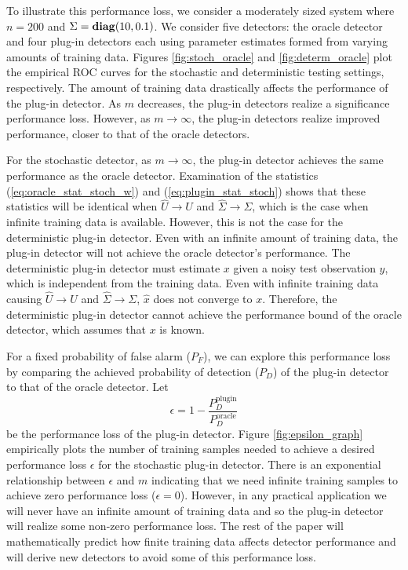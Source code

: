 To illustrate this performance loss, we consider a moderately sized system where $n=200$ and $\Sigma=\mathop{\bf diag}(10,0.1)$. We consider five detectors: the oracle detector and four plug-in detectors each using parameter estimates formed from varying amounts of training data. Figures \ref{fig:stoch_oracle} and \ref{fig:determ_oracle} plot the empirical ROC curves for the stochastic and deterministic testing settings, respectively. The amount of training data drastically affects the performance of the plug-in detector. As $m$ decreases, the plug-in detectors realize a significance performance loss. However, as $m\to\infty$, the plug-in detectors realize improved performance, closer to that of the oracle detectors.

For the stochastic detector, as $m\to\infty$, the plug-in detector achieves the same performance as the oracle detector. Examination of the statistics (\ref{eq:oracle_stat_stoch_w}) and (\ref{eq:plugin_stat_stoch}) shows that these statistics will be identical when $\widehat{U}\to U$ and $\widehat{\Sigma}\to\Sigma$, which is the case when infinite training data is available. However, this is not the case for the deterministic plug-in detector. Even with an infinite amount of training data, the plug-in detector will not achieve the oracle detector's performance. The deterministic plug-in detector must estimate $x$ given a noisy test observation $y$, which is independent from the training data. Even with infinite training data causing $\widehat{U}\to U$ and $\widehat{\Sigma}\to\Sigma$, $\widehat{x}$ does not converge to $x$. Therefore, the deterministic plug-in detector cannot achieve the performance bound of the oracle detector, which assumes that $x$ is known.

For a fixed probability of false alarm ($P_F$), we can explore this performance loss by comparing the achieved probability of detection ($P_D$) of the plug-in detector to that of the oracle detector. Let
\begin{equation}\label{eq:epsilon}
\epsilon = 1 - \frac{P_D^{\text{plugin}}}{P_D^{\text{oracle}}}
\end{equation}
be the performance loss of the plug-in detector. Figure \ref{fig:epsilon_graph} empirically plots the number of training samples needed to achieve a desired performance loss $\epsilon$ for the stochastic plug-in detector. There is an exponential relationship between $\epsilon$ and $m$ indicating that we need infinite training samples to achieve zero performance loss ($\epsilon=0$). However, in any practical application we will never have an infinite amount of training data and so the plug-in detector will realize some non-zero performance loss. The rest of the paper will mathematically predict how finite training data affects detector performance and will derive new detectors to avoid some of this performance loss.

